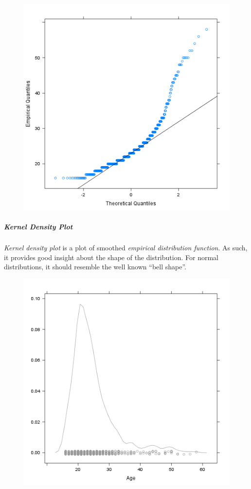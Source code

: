 \documentclass[]{article}
\makeatletter
\def\maxwidth{\ifdim\Gin@nat@width>\linewidth\linewidth
\else\Gin@nat@width\fi}
\let\Oldincludegraphics\includegraphics
\renewcommand{\includegraphics}[1]{\Oldincludegraphics[width=\maxwidth]{#1}}
\makeatother
\begin{document}
\begin{figure}[htbp]
\centering
\includegraphics{cbbba756d844aa053998959b73b9feff.png}
\caption{}
\end{figure}

\subparagraph{Kernel Density Plot}

\emph{Kernel density plot} is a plot of smoothed \emph{empirical
distribution function}. As such, it provides good insight about the
shape of the distribution. For normal distributions, it should resemble
the well known ``bell shape''.

\begin{figure}[htbp]
\centering
\includegraphics{4599005cf6ab3467d8da53b77f40ff98.png}
\caption{}
\end{figure}
\end{document}
